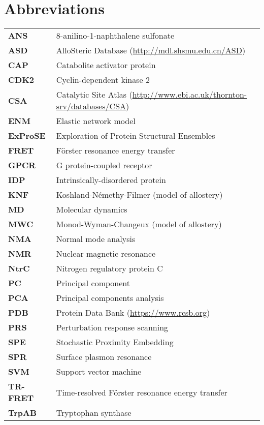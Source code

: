 \section*{Abbreviations}

\begin{tabular}{ >{\bfseries}l l }
ANS      &  8-anilino-1-naphthalene sulfonate \\
ASD      &  AlloSteric Database (\url{http://mdl.shsmu.edu.cn/ASD}) \\
CAP      &  Catabolite activator protein \\
CDK2     &  Cyclin-dependent kinase 2 \\
CSA      &  Catalytic Site Atlas (\url{http://www.ebi.ac.uk/thornton-srv/databases/CSA}) \\
ENM      &  Elastic network model \\
ExProSE  &  Exploration of Protein Structural Ensembles \\
FRET     &  F\"{o}rster resonance energy transfer \\
GPCR     &  G protein-coupled receptor \\
IDP      &  Intrinsically-disordered protein \\
KNF      &  Koshland-N\'{e}methy-Filmer (model of allostery) \\
MD       &  Molecular dynamics \\
MWC      &  Monod-Wyman-Changeux (model of allostery) \\
NMA      &  Normal mode analysis \\
NMR      &  Nuclear magnetic resonance \\
NtrC     &  Nitrogen regulatory protein C \\
PC       &  Principal component \\
PCA      &  Principal components analysis \\
PDB      &  Protein Data Bank (\url{https://www.rcsb.org}) \\
PRS      &  Perturbation response scanning \\
SPE      &  Stochastic Proximity Embedding \\
SPR      &  Surface plasmon resonance \\
SVM      &  Support vector machine \\
TR-FRET  &  Time-resolved F\"{o}rster resonance energy transfer \\
TrpAB    &  Tryptophan synthase \\
\end{tabular}
